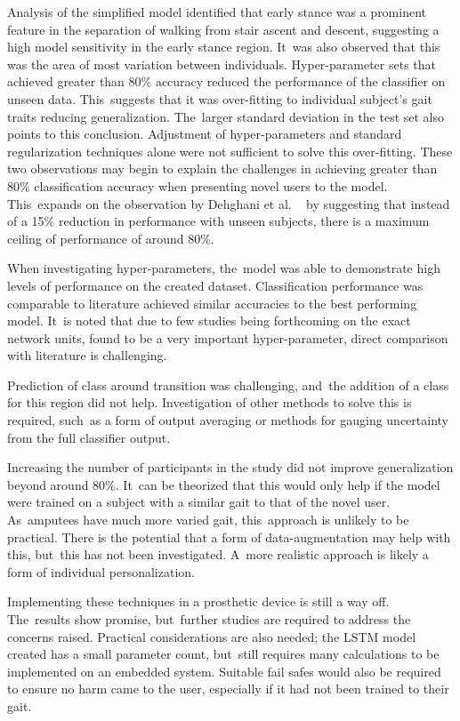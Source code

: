 Analysis of the simplified model identified that early stance was a prominent feature in the separation of walking from stair ascent and descent, suggesting a high model sensitivity in the early stance region. It~was also observed that this was the area of most variation between individuals. Hyper-parameter sets that achieved greater than 80\% accuracy reduced the performance of the classifier on unseen data. This~suggests that it was over-fitting to individual subject's gait traits reducing generalization. The~larger standard deviation in the test set also points to this conclusion. Adjustment of hyper-parameters and standard regularization techniques alone were not sufficient to solve this over-fitting. These two observations may begin to explain the challenges in achieving greater than 80\% classification accuracy when presenting novel users to the model. This~expands on the observation by Dehghani et al. ~\cite{Dehghani2019} by suggesting that instead of a 15\% reduction in performance with unseen subjects, there is a maximum ceiling of performance of around 80\%.

When investigating hyper-parameters, the~model was able to demonstrate high levels of performance on the created dataset. Classification performance was comparable to literature achieved similar accuracies to the best performing model. It~is noted that due to few studies being forthcoming on the exact network units, found to be a very important hyper-parameter, direct comparison with literature is challenging.

Prediction of class around transition was challenging, and~the addition of a class for this region did not help. Investigation of other methods to solve this is required, such~as a form of output averaging or methods for gauging uncertainty from the full classifier output.

Increasing the number of participants in the study did not improve generalization beyond around 80\%. It~can be theorized that this would only help if the model were trained on a subject with a similar gait to that of the novel user. As~amputees have much more varied gait, this~approach is unlikely to be practical. There is the potential that a form of data-augmentation may help with this, but~this has not been investigated. A~more realistic approach is likely a form of individual personalization.

Implementing these techniques in a prosthetic device is still a way off. The~results show promise, but~further studies are required to address the concerns raised. Practical considerations are also needed; the LSTM model created has a small parameter count, but~still requires many calculations to be implemented on an embedded system. Suitable fail safes would also be required to ensure no harm came to the user, especially if it had not been trained to their gait.

